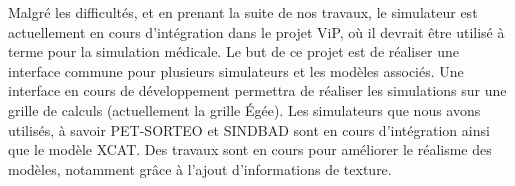 Malgré les difficultés, et en prenant la suite de nos travaux, le simulateur est
actuellement en cours d'intégration dans le projet  ViP, où il devrait être
utilisé à terme pour la simulation médicale. Le but de ce projet est de réaliser
une interface commune pour plusieurs simulateurs et les modèles associés. Une
interface en cours de développement permettra de réaliser les simulations sur
une grille de calculs (actuellement la grille Égée). Les simulateurs que nous
avons utilisés, à savoir PET-SORTEO et SINDBAD sont en cours d'intégration ainsi
que le modèle XCAT. Des travaux sont en cours pour améliorer le réalisme des
modèles, notamment grâce à l'ajout d'informations de texture.  














